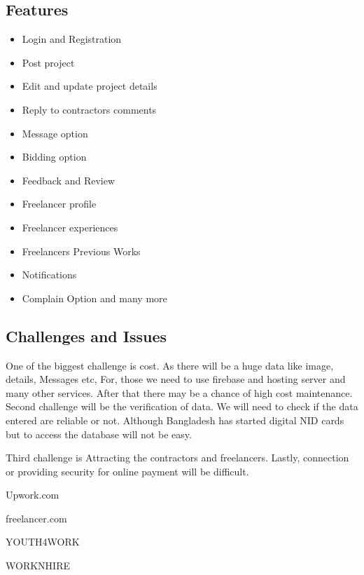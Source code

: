 \documentclass{article}
\begin{document}
    \subsection{Features}
         \begin{itemize}
            \item 
                Login and Registration
            \item  
                Post project
            \item  
                Edit and update project details
            \item  
                Reply to contractors comments
            \item
                Message option
            \item 
                Bidding option
            \item   
                Feedback and Review
            \item
                Freelancer profile
            \item
                Freelancer experiences
            \item
                Freelancers Previous Works
            \item
                Notifications
            \item
                Complain Option and many more
        \end{itemize}    
    \subsection{Challenges and Issues}
    One of the biggest challenge is cost. As there will be a huge data like image,
details, Messages etc, For, those we need to use firebase and hosting server and many other services. After that there may be a chance of high cost maintenance.
Second challenge will be the verification of data. We will need to check if the
data entered are reliable or not. Although Bangladesh has started digital NID
cards but to access the database will not be easy.

Third challenge is Attracting the contractors and freelancers.
Lastly, connection or providing security for online payment will be difficult.

\begin{thebibliography}{9}
Upwork.com

freelancer.com

YOUTH4WORK

WORKNHIRE
\end{thebibliography}
\end{document}
